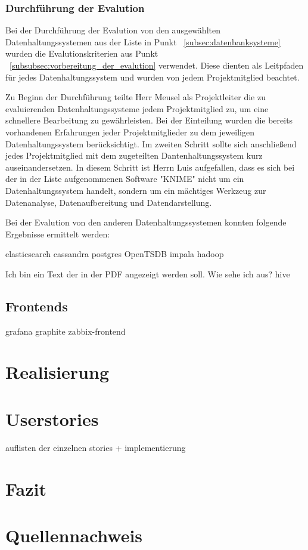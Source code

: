 \subsubsection{Durchführung der Evalution}
\label{subsubsec:durchfuehrung_der_evalution}
Bei der Durchführung der Evalution von den ausgewählten
Datenhaltungssystemen aus der Liste in Punkt ~\ref{subsec:datenbanksysteme}
wurden die Evalutionskriterien aus Punkt 
~\ref{subsubsec:vorbereitung_der_evalution} verwendet. Diese dienten
als Leitpfaden für jedes Datenhaltungssystem und wurden von jedem
Projektmitglied beachtet.

Zu Beginn der Durchführung teilte Herr Meusel als Projektleiter
die zu evaluierenden Datenhaltungssysteme jedem Projektmitglied zu,
um eine schnellere Bearbeitung zu gewährleisten. Bei der Einteilung
wurden die bereits vorhandenen Erfahrungen jeder Projektmitglieder zu
dem jeweiligen Datenhaltungssystem berücksichtigt. Im zweiten Schritt
sollte sich anschließend jedes Projektmitglied mit dem zugeteilten
Dantenhaltungssystem kurz auseinandersetzen. In diesem Schritt ist
Herrn Luis aufgefallen, dass es sich bei der in der Liste
aufgenommenen Software "KNIME" nicht um ein Datenhaltungssystem
handelt, sondern um ein mächtiges Werkzeug zur Datenanalyse,
Datenaufbereitung und Datendarstellung.

Bei der Evalution von den anderen Datenhaltungssystemen konnten
folgende Ergebnisse ermittelt werden: 
\begin{evalution}
  \1 elasticsearch
  \1 cassandra
  \1 postgres
  \1 OpenTSDB
  \1 impala
  \1 hadoop
  
  Ich bin ein Text der in der PDF angezeigt werden soll.
  Wie sehe ich aus?
  \1 hive
\end{evalution}
\nl%

\subsection{Frontends}

\begin{outline}
  \1 grafana
  \1 graphite
  \1 zabbix-frontend
\end{outline}

\section{Realisierung}

\section{Userstories}
auflisten der einzelnen stories + implementierung

\section{Fazit}

\section{Quellennachweis}
\printbibliography%
